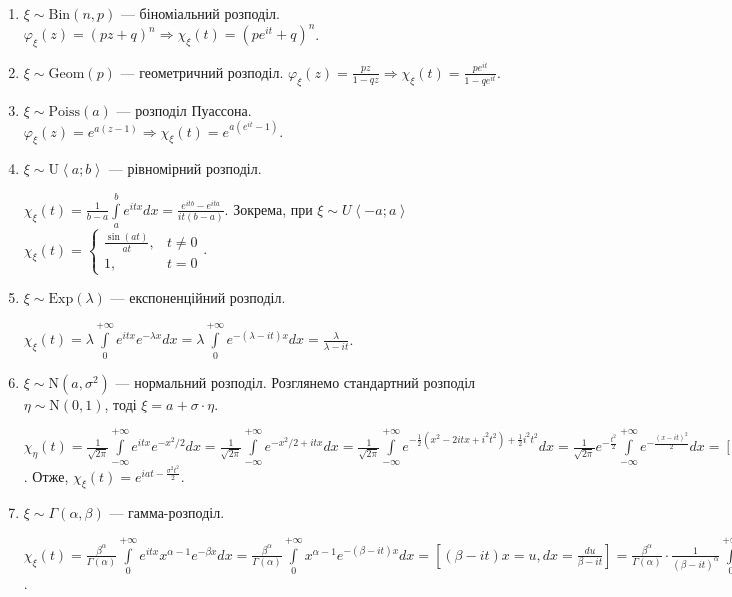 \begin{enumerate}
    \item $\xi \sim \mathrm{Bin}(n,p)$ --- біноміальний розподіл.
    $\varphi_\xi(z) = (pz+q)^n \Rightarrow \chi_\xi(t) = \left( p e^{it} + q\right)^n$.
    \item $\xi \sim \mathrm{Geom}(p)$ --- геометричний розподіл.
    $\varphi_\xi(z) = \frac{pz}{1-qz} \Rightarrow \chi_\xi(t) = \frac{p e^{it}}{1-q e^{it}}$.
    \item $\xi \sim \mathrm{Poiss}(a)$ --- розподіл Пуассона.
    $\varphi_\xi(z) = e^{a(z-1)} \Rightarrow \chi_\xi(t) = e^{a(e^{it}-1)}$.
    \item $\xi \sim \mathrm{U}\left< a; b\right>$ --- рівномірний розподіл.

    $\chi_\xi(t) = \frac{1}{b-a} \int\limits_a^b e^{itx} dx = \frac{e^{itb} - e^{ita}}{it(b-a)}$.
    Зокрема, при $\xi \sim {U}\left< -a; a\right>$ $\chi_\xi(t) = \begin{cases}
        \frac{\sin(at)}{at}, & t \neq 0 \\
        1, & t = 0
    \end{cases}$.
    \item $\xi \sim \mathrm{Exp}(\lambda)$ --- експоненційний розподіл.
    
    $\chi_\xi(t) = \lambda \int\limits_0^{+\infty} e^{itx} e^{-\lambda x} dx = \lambda \int\limits_0^{+\infty} e^{-(\lambda-it)x} dx = \frac{\lambda}{\lambda - it}$.
    \item $\xi \sim \mathrm{N}(a, \sigma^2)$ --- нормальний розподіл. Розглянемо стандартний розподіл $\eta \sim \mathrm{N}(0, 1)$,
    тоді $\xi = a + \sigma\cdot\eta$.

    $\chi_\eta(t) = \frac{1}{\sqrt{2\pi}} \int\limits_{-\infty}^{+\infty} e^{itx} e^{-x^2/2} dx = 
    \frac{1}{\sqrt{2\pi}} \int\limits_{-\infty}^{+\infty} e^{-x^2/2 + itx} dx = 
    \frac{1}{\sqrt{2\pi}} \int\limits_{-\infty}^{+\infty} e^{-\frac{1}{2}(x^2 - 2itx + i^2t^2) + \frac{1}{2}i^2t^2} dx = 
    \frac{1}{\sqrt{2\pi}} e^{-\frac{t^2}{2}} \int\limits_{-\infty}^{+\infty} e^{-\frac{(x-it)^2}{2}} dx = 
    \left[ x-it = u, dx = du\right] = e^{-\frac{t^2}{2}}$.
    Отже, $\chi_\xi(t) = e^{iat - \frac{\sigma^2 t^2}{2}}$.
    \item $\xi \sim \Gamma(\alpha, \beta)$ --- гамма-розподіл.
    
    $\chi_\xi(t) = \frac{\beta^\alpha}{\Gamma(\alpha)} \int\limits_0^{+\infty} e^{itx} x^{\alpha-1} e^{-\beta x} dx =
    \frac{\beta^\alpha}{\Gamma(\alpha)} \int\limits_0^{+\infty} x^{\alpha-1} e^{-(\beta-it) x} dx = \left[ (\beta-it) x = u, dx = \frac{du}{\beta-it}\right] = 
    \frac{\beta^\alpha}{\Gamma(\alpha)} \cdot \frac{1}{(\beta-it)^\alpha} \int\limits_0^{+\infty} u^{\alpha-1} e^{-u} du = 
    \frac{\beta^\alpha}{\Gamma(\alpha)} \cdot \frac{1}{(\beta-it)^\alpha} \cdot \Gamma(\alpha) = (1-\frac{it}{\beta})^{-\alpha}$.
\end{enumerate}

